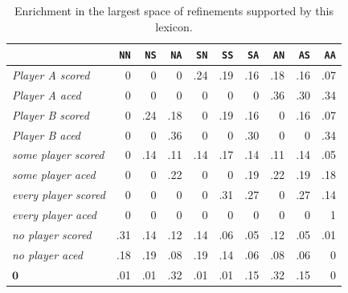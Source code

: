 \documentclass[leqno,12pt]{article}
\newcommand{\word}[1]{\emph{#1}}
\newcommand{\graycell}[1]{{\cellcolor[gray]{.8}#1}}
\newcommand{\nullmsg}{\mathbf{0}}
\newcommand{\world}[1]{\texttt{#1}}
\begin{document}
{\begin{table}[t]
  \centering
  \renewcommand{\arraystretch}{0.98}
  \setlength{\tabcolsep}{8pt}
  \begin{tabular}[c]{l *{9}{r} }
    \toprule
    & \world{NN} & \world{NS} & \world{NA} & \world{SN} & \world{SS} & \world{SA} & \world{AN} & \world{AS} & \world{AA}\\
    \midrule
    \word{Player A scored}     & 0 & 0 & 0 & \graycell{.24} & .19 & .16 & .18 & .16 & .07\\
    \word{Player A aced}       & 0 & 0 & 0 & 0 & 0 & 0 & \graycell{.36} & .30 & .34\\
    \word{Player B scored}     & 0 & \graycell{.24} & .18 & 0 & .19 & .16 & 0 & .16 & .07\\
    \word{Player B aced}       & 0 & 0 & \graycell{.36} & 0 & 0 & .30 & 0 & 0 & .34\\
    \word{some player scored}  & 0 & .14 & .11 & .14 & \graycell{.17} & .14 & .11 & .14 & .05\\
    \word{some player aced}    & 0 & 0 & \graycell{.22} & 0 & 0 & .19 & \graycell{.22} & .19 & .18\\
    \word{every player scored} & 0 & 0 & 0 & 0 & \graycell{.31} & .27 & 0 & .27 & .14\\
    \word{every player aced}   & 0 & 0 & 0 & 0 & 0 & 0 & 0 & 0 & \graycell{1}\\
    \word{no player scored}    & \graycell{.31} & .14 & .12 & .14 & .06 & .05 & .12 & .05 & .01\\
    \word{no player aced}      & .18 & \graycell{.19} & .08 & \graycell{.19} & .14 & .06 & .08 & .06 & 0\\
    $\nullmsg$                 & .01 & .01 & \graycell{.32} & .01 & .01 & .15 & \graycell{.32} & .15 & 0\\
    \bottomrule
  \end{tabular}
  \caption{Enrichment in the largest space of refinements supported by this lexicon.}
  \label{tab:subjects}
\end{table}

}
\end{document}
